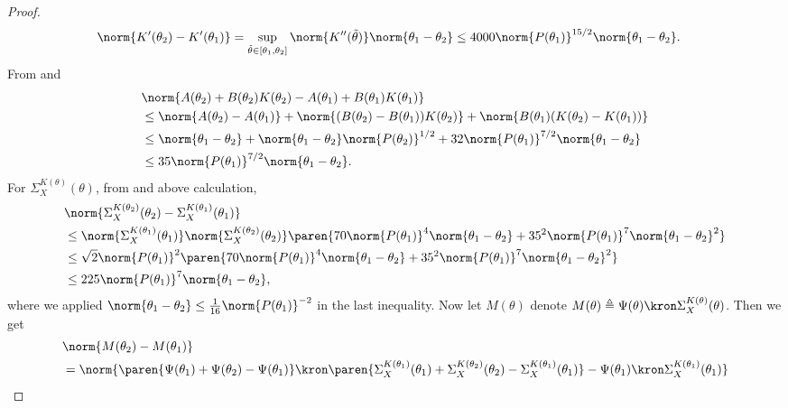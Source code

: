 \begin{proof}
    \begin{align*}
        \norm{K'(\theta_2)-K'(\theta_1)} 
        &= \sup_{\tilde\theta\in[\theta_1, \theta_2]}\norm{K''(\tilde\theta)}\norm{\theta_1-\theta_2}
        \leq 4000\norm{P(\theta_1)}^{15/2}\norm{\theta_1-\theta_2}.
    \end{align*}
    From  and 
    \begin{align*}
        &\norm{A(\theta_2)+B(\theta_2)K(\theta_2) - A(\theta_1)+B(\theta_1)K(\theta_1)} \\
        &\leq \norm{A(\theta_2)-A(\theta_1)} + \norm{(B(\theta_2)-B(\theta_1))K(\theta_2)} + \norm{B(\theta_1)(K(\theta_2)-K(\theta_1))} \\
        &\leq \norm{\theta_1-\theta_2} + \norm{\theta_1-\theta_2}\norm{P(\theta_2)}^{1/2} + 32\norm{P(\theta_1)}^{7/2}\norm{\theta_1-\theta_2} \\
        &\leq 35\norm{P(\theta_1)}^{7/2}\norm{\theta_1-\theta_2}. 
    \end{align*}
    For $\Sigma_X^{K(\theta)}(\theta)$, from  and above calculation, 
    \begin{align*}
        &\norm{\Sigma_X^{K(\theta_2)}(\theta_2) - \Sigma_X^{K(\theta_1)}(\theta_1)} \\
        &\leq \norm{\Sigma_X^{K(\theta_1)}(\theta_1)}\norm{\Sigma_X^{K(\theta_2)}(\theta_2)}\paren{70\norm{P(\theta_1)}^{4}\norm{\theta_1-\theta_2} + 35^2\norm{P(\theta_1)}^{7}\norm{\theta_1-\theta_2}^2} \\
        &\leq \sqrt{2}\norm{P(\theta_1)}^2\paren{70\norm{P(\theta_1)}^{4}\norm{\theta_1-\theta_2} + 35^2\norm{P(\theta_1)}^{7}\norm{\theta_1-\theta_2}^2} \\
        &\leq 225\norm{P(\theta_1)}^{7}\norm{\theta_1-\theta_2},
    \end{align*}
    where we applied $\norm{\theta_1-\theta_2} \leq \frac{1}{16}\norm{P(\theta_1)}^{-2}$ in the last inequality.
    Now let $M(\theta)$ denote $M(\theta) \triangleq \Psi(\theta)\kron\Sigma_X^{K(\theta)}(\theta)$. 
    Then we get
    \begin{align*}
        &\norm{M(\theta_2) - M(\theta_1)} \\
        &= \norm{\paren{\Psi(\theta_1) + \Psi(\theta_2) - \Psi(\theta_1)}\kron\paren{\Sigma_X^{K(\theta_1)}(\theta_1) + \Sigma_X^{K(\theta_2)}(\theta_2) - \Sigma_X^{K(\theta_1)}(\theta_1)} - \Psi(\theta_1)\kron\Sigma_X^{K(\theta_1)}(\theta_1)} \\

\end{align*}
\end{proof}
